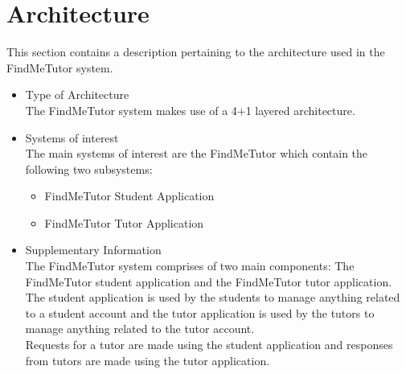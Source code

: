 \documentclass[12pt]{article}
\begin{document}

\section{Architecture}
This section contains a description pertaining to the architecture used in the FindMeTutor system.
\begin{itemize}
\item Type of Architecture\\
The FindMeTutor system makes use of a 4+1 layered architecture. %
\item Systems of interest\\
The main systems of interest are the FindMeTutor which contain the following two subsystems:\\
\begin{itemize}
\item FindMeTutor Student Application\\
\item FindMeTutor Tutor Application\\
\end{itemize}
\item Supplementary Information\\
The FindMeTutor system comprises of two main components: The FindMeTutor student application and the FindMeTutor tutor application. The student application is used by the students to manage anything related to a student account and the tutor application is used by the tutors to manage anything related to the tutor account. \\
Requests for a tutor are made using the student application and responses from tutors are made using the tutor application.
\end{itemize}
\end{document}
